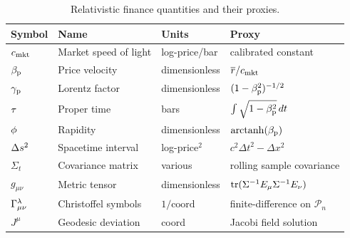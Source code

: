 \begin{table}[ht]
\centering
\caption{Relativistic finance quantities and their \ohlcv{} proxies.}
\label{tab:quantities}
\begin{tabular}{llll}
  \toprule
  \textbf{Symbol} & \textbf{Name} & \textbf{Units} & \textbf{\ohlcv{} Proxy} \\
  \midrule
  $c_{\mathrm{mkt}}$      & Market speed of light & log-price/bar & calibrated constant \\
  $\beta_{\mathrm{p}}$        & Price velocity        & dimensionless & $\overline{r}/c_{\mathrm{mkt}}$ \\
  $\gamma_{\mathrm{p}}$       & Lorentz factor        & dimensionless & $(1-\beta_{\mathrm{p}}^2)^{-1/2}$ \\
  $\tau$      & Proper time           & bars          & $\int\sqrt{1-\beta_{\mathrm{p}}^2}\,dt$ \\
  $\phi$     & Rapidity              & dimensionless & $\operatorname{arctanh}(\beta_{\mathrm{p}})$ \\
  $\Delta s^2$  & Spacetime interval    & log-price$^2$ & $c^2\Delta t^2 - \Delta x^2$ \\
  $\Sigma_t$      & Covariance matrix     & various       & rolling sample covariance \\
  $g_{\mu\nu}$    & Metric tensor         & dimensionless & $\operatorname{tr}(\Sigma^{-1}E_\mu\Sigma^{-1}E_\nu)$ \\
  $\Gamma^{\lambda}_{\mu \nu}$ & Christoffel symbols & $1/\text{coord}$ & finite-difference on $\mathcal{P}_n$ \\
  $J^\mu$         & Geodesic deviation    & coord         & Jacobi field solution \\
  \bottomrule
\end{tabular}
\end{table}
